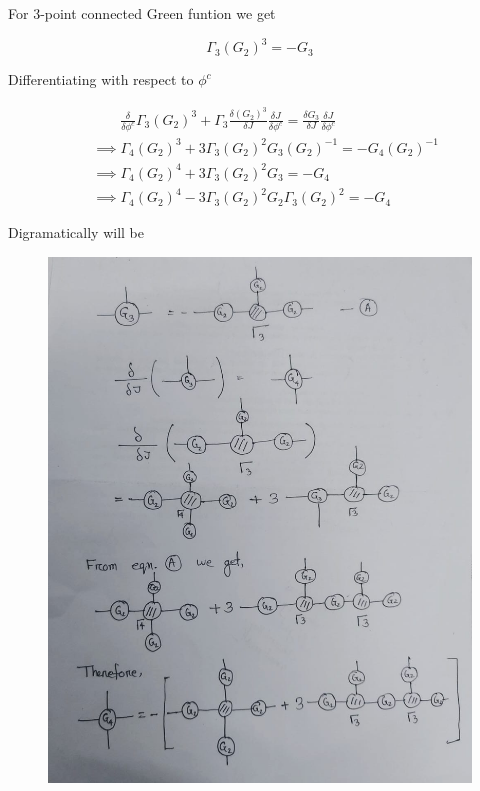 \documentclass[12pt, letterpaper]{article}
\author{Noor E Mustafa Ferdous}
\title{}
\date{}
\newcommand*{\1}{\hspace{1pt}}
\begin{document}
    For 3-point connected Green funtion we get

    \begin{equation}
        \Gamma_{3}(G_{2})^{3} = - G_{3}
    \end{equation}

    Differentiating with respect to $\phi^{c}$

    \begin{align*}
        & \ \ \ \  \ \ \ \ \   \frac{\delta}{\delta \phi^{c}} \Gamma_{3}(G_{2})^{3} + \Gamma_{3}\frac{\delta (G_{2})^{3}}{\delta J}\frac{\delta J}{\delta \phi^{c}}  = \frac{\delta G_{3}}{\delta J}\frac{\delta J}{\delta \phi^{c}} \\ 
        & \implies \Gamma_{4}(G_{2})^{3} + 3 \Gamma_{3}(G_{2})^{2}G_{3}(G_{2})^{-1} = - G_{4}(G_{2})^{-1} \\ 
        & \implies \Gamma_{4} (G_{2})^{4} +3\Gamma_{3}(G_{2})^{2}G_{3}  = - G_{4} \\ 
        & \implies \Gamma_{4} (G_{2})^{4} -3\Gamma_{3}(G_{2})^{2}G_{2}\Gamma_{3}(G_{2})^{2}  = - G_{4} \tag*{[from eqn (1)]}
    \end{align*}

    Digramatically will be 

    \begin{figure}[h]
    \centering
    \includegraphics[scale=0.1]{spic}
    \end{figure}



    
\end{document}
